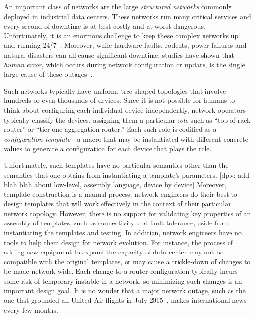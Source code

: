 \documentclass{sig-alternate-10pt}
\newcommand{\dpw}[1]{\textcolor{tmlblue}{[dpw: #1]}}
\begin{document}

An important class of networks are the large \emph{structured networks}
commonly deployed in industrial data centers.  These networks run
many critical services and every second of downtime is at best
costly and at worst dangerous.  Unfortunately, it is an enormous
challenge to keep these complex networks up and
running 24/7~\cite{mahajan+:bgp-misconfiguration,feamster+:rcc,batfish,dc-failure-study}.
Moreover, while hardware faults, rodents, power failures and natural
disasters can all cause significant downtime, studies have shown that
\emph{human error}, which occurs during network configuration or
update, is the single large cause of these
outages~\cite{juniper-study}.

Such networks typically have uniform, tree-shaped topologies that involve
hundreds or even thousands of devices.  Since it is not possible for humans
to think about configuring each individual device independently,
network operators typically classify the devices, assigning them a particular
\emph{role} such as ``top-of-rack router'' or ``tier-one aggregation router.''
Each such role is codified as a \emph{configuration template}---a macro
that may be instantiated with different concrete values to
generate a configuration for each device that plays the role.

Unfortunately, such templates have no particular semantics other than the
semantics
that one obtains from instantiating a template's parameters.
\dpw{add blah blah about low-level, assembly language, device by device}
Moreover,
template construction is a manual process:  network engineers do their
best to design templates that will work effectively in the context
of their particular network topology.  However, there is no support for
validating key properties of an assembly of templates, such as connectivity
and fault tolerance,
aside from instantiating the templates and testing.  In addition,
network engineers have no tools to help them design for network
evolution.  For instance, the process of adding new equipment to
expand the capacity of data center may not be compatible with the original
templates, or may cause a trickle-down of changes to be made network-wide.
Each change to a router configuration typically incurs
some risk of temporary instable in a network, so minimizing such changes
is an important design goal.  It is no wonder that a major
network outage, such as the one that grounded all United Air flights
in July 2015~\cite{x}, makes international news every few months.
\end{document}
